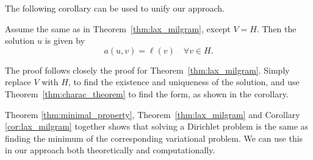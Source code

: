 The following corollary can be used to unify our approach.
\begin{kor}{\quad}
   Assume the same as in Theorem~\ref{thm:lax_milgram}, except $V=H$. Then 
   the solution $u$ is given by~\label{cor:lax_milgram}
   \begin{equation*}
    a(u,v) = \ell(v) \quad \forall v \in H.
   \end{equation*}
   \vspace{-8mm}
\end{kor}
\begin{bev}
    The proof follows closely the proof for Theorem~\ref{thm:lax_milgram}. 
    Simply replace $V$ with $H$, to find the existence and uniqueness of the 
    solution, and use Theorem~\ref{thm:charac_theorem} to find the form, as 
    shown in the corollary.
\end{bev}
Theorem \ref{thm:minimal_property}, Theorem~\ref{thm:lax_milgram} and Corollary 
\ref{cor:lax_milgram} together shows that solving a Dirichlet problem is 
the same as finding the minimum of the corresponding variational problem. 
We can use this in our approach both theoretically and computationally.